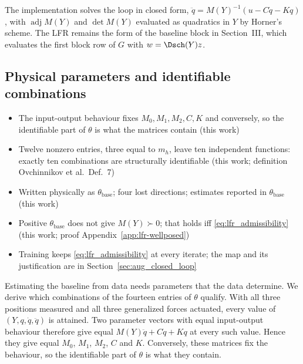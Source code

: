 The implementation solves the loop in closed form,
$\ddot q=M(Y)^{-1}(u-C\dot q-Kq)$, with $\operatorname{adj}M(Y)$ and
$\det M(Y)$ evaluated as quadratics in $Y$ by Horner's scheme.
The LFR remains the form of the baseline block in Section~III, which
evaluates the first block row of $G$ with $w=\Dsch(Y)z$.

\subsection{Physical parameters and identifiable combinations}\label{sec:params}
\ifdraft
\begin{itemize}
\item The input-output behaviour fixes $M_0,M_1,M_2,C,K$ and conversely, so the identifiable part of $\theta$ is what the matrices contain (this work)
\item Twelve nonzero entries, three equal to $m_h$, leave ten independent functions: exactly ten combinations are structurally identifiable (this work; definition Ovchinnikov et al.\ Def.~7)
\item Written physically as $\theta_{\mathrm{base}}$; four lost directions; estimates reported in $\theta_{\mathrm{base}}$ (this work)
\item Positive $\theta_{\mathrm{base}}$ does not give $M(Y)\succ0$; that holds iff \eqref{eq:lfr_admissibility} (this work; proof Appendix~\ref{app:lfr-wellposed})
\item Training keeps \eqref{eq:lfr_admissibility} at every iterate; the map and its justification are in Section~\ref{sec:aug_closed_loop}
\end{itemize}
\fi

Estimating the baseline from data needs parameters that the data determine.
We derive which combinations of the fourteen entries of $\theta$ qualify.
With all three positions measured and all three generalized forces actuated,
every value of $(Y,q,\dot q,\ddot q)$ is attained.
Two parameter vectors with equal input-output behaviour therefore give equal
$M(Y)\ddot q+C\dot q+Kq$ at every such value.
Hence they give equal $M_0$, $M_1$, $M_2$, $C$ and $K$.
Conversely, these matrices fix the behaviour, so the identifiable part of
$\theta$ is what they contain.


